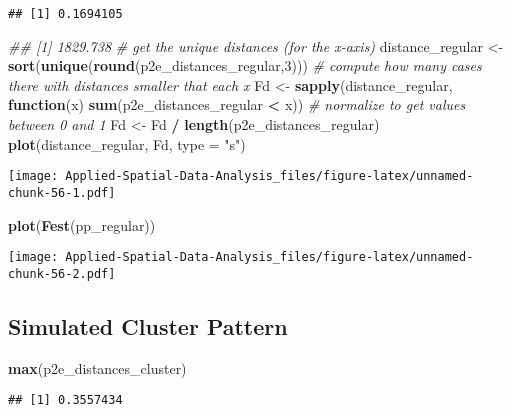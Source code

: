 \documentclass[
]{book}
\newenvironment{Shaded}{\begin{snugshade}}{\end{snugshade}}
\newcommand{\CommentTok}[1]{\textcolor[rgb]{0.56,0.35,0.01}{\textit{#1}}}
\newcommand{\ControlFlowTok}[1]{\textcolor[rgb]{0.13,0.29,0.53}{\textbf{#1}}}
\newcommand{\DataTypeTok}[1]{\textcolor[rgb]{0.13,0.29,0.53}{#1}}
\newcommand{\DecValTok}[1]{\textcolor[rgb]{0.00,0.00,0.81}{#1}}
\newcommand{\KeywordTok}[1]{\textcolor[rgb]{0.13,0.29,0.53}{\textbf{#1}}}
\newcommand{\NormalTok}[1]{#1}
\newcommand{\OperatorTok}[1]{\textcolor[rgb]{0.81,0.36,0.00}{\textbf{#1}}}
\newcommand{\StringTok}[1]{\textcolor[rgb]{0.31,0.60,0.02}{#1}}
\begin{document}
\begin{verbatim}
## [1] 0.1694105
\end{verbatim}

\begin{Shaded}
\begin{Highlighting}[]
\CommentTok{## [1] 1829.738}
\CommentTok{# get the unique distances (for the x-axis)}
\NormalTok{distance_regular <-}\StringTok{ }\KeywordTok{sort}\NormalTok{(}\KeywordTok{unique}\NormalTok{(}\KeywordTok{round}\NormalTok{(p2e_distances_regular,}\DecValTok{3}\NormalTok{)))}
\CommentTok{# compute how many cases there with distances smaller that each x}
\NormalTok{Fd <-}\StringTok{ }\KeywordTok{sapply}\NormalTok{(distance_regular, }\ControlFlowTok{function}\NormalTok{(x) }\KeywordTok{sum}\NormalTok{(p2e_distances_regular }\OperatorTok{<}\StringTok{ }\NormalTok{x))}
\CommentTok{# normalize to get values between 0 and 1}
\NormalTok{Fd <-}\StringTok{ }\NormalTok{Fd }\OperatorTok{/}\StringTok{ }\KeywordTok{length}\NormalTok{(p2e_distances_regular)}
\KeywordTok{plot}\NormalTok{(distance_regular, Fd, }\DataTypeTok{type =} \StringTok{"s"}\NormalTok{)}
\end{Highlighting}
\end{Shaded}

\texttt{[image: Applied-Spatial-Data-Analysis\_files/figure-latex/unnamed-chunk-56-1.pdf]}

\begin{Shaded}
\begin{Highlighting}[]
\KeywordTok{plot}\NormalTok{(}\KeywordTok{Fest}\NormalTok{(pp_regular))}
\end{Highlighting}
\end{Shaded}

\texttt{[image: Applied-Spatial-Data-Analysis\_files/figure-latex/unnamed-chunk-56-2.pdf]}

\hypertarget{simulated-cluster-pattern-3}{%
\subsection{Simulated Cluster Pattern}\label{simulated-cluster-pattern-3}}

\begin{Shaded}
\begin{Highlighting}[]
\KeywordTok{max}\NormalTok{(p2e_distances_cluster)}
\end{Highlighting}
\end{Shaded}

\begin{verbatim}
## [1] 0.3557434
\end{verbatim}
\end{document}
